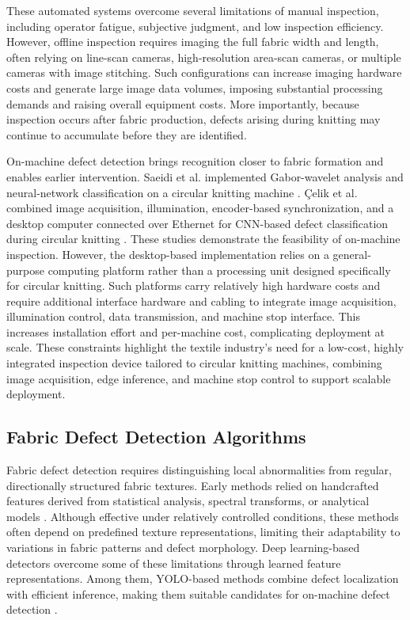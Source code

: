 \documentclass[a4paper,fleqn]{cas-dc}
\begin{document}
These automated systems overcome several limitations of manual inspection, including operator fatigue, subjective judgment, and low inspection efficiency. However, offline inspection requires imaging the full fabric width and length, often relying on line-scan cameras, high-resolution area-scan cameras, or multiple cameras with image stitching. Such configurations can increase imaging hardware costs and generate large image data volumes, imposing substantial processing demands and raising overall equipment costs. More importantly, because inspection occurs after fabric production, defects arising during knitting may continue to accumulate before they are identified.

On-machine defect detection brings recognition closer to fabric formation and enables earlier intervention. Saeidi et al. implemented Gabor-wavelet analysis and neural-network classification on a circular knitting machine \cite{saeidi2005vision}. \c{C}elik et al. combined image acquisition, illumination, encoder-based synchronization, and a desktop computer connected over Ethernet for CNN-based defect classification during circular knitting \cite{celik2022circular}. These studies demonstrate the feasibility of on-machine inspection. However, the desktop-based implementation relies on a general-purpose computing platform rather than a processing unit designed specifically for circular knitting. Such platforms carry relatively high hardware costs and require additional interface hardware and cabling to integrate image acquisition, illumination control, data transmission, and machine stop interface. This increases installation effort and per-machine cost, complicating deployment at scale. These constraints highlight the textile industry's need for a low-cost, highly integrated inspection device tailored to circular knitting machines, combining image acquisition, edge inference, and machine stop control to support scalable deployment.

\subsection{Fabric Defect Detection Algorithms}
Fabric defect detection requires distinguishing local abnormalities from regular, directionally structured fabric textures. Early methods relied on handcrafted features derived from statistical analysis, spectral transforms, or analytical models \cite{kumar2008survey,ngan2011review}. Although effective under relatively controlled conditions, these methods often depend on predefined texture representations, limiting their adaptability to variations in fabric patterns and defect morphology. Deep learning-based detectors overcome some of these limitations through learned feature representations. Among them, YOLO-based methods combine defect localization with efficient inference, making them suitable candidates for on-machine defect detection \cite{redmon2016yolo}.
\end{document}
